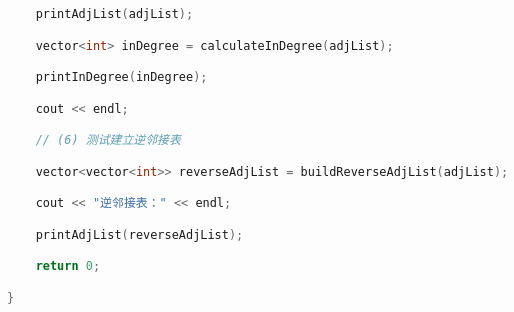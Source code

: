 \begin{lstlisting}[language=C++]
    printAdjList(adjList);

    vector<int> inDegree = calculateInDegree(adjList);

    printInDegree(inDegree);

    cout << endl;

    // (6) 测试建立逆邻接表

    vector<vector<int>> reverseAdjList = buildReverseAdjList(adjList);

    cout << "逆邻接表：" << endl;

    printAdjList(reverseAdjList);

    return 0;

}
\end{lstlisting}
